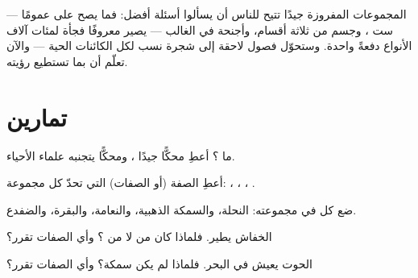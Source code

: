 \begin{remark}\label{rem:g3:sorting-living-things:science}
المجموعات المفروزة جيدًا تتيح للناس أن يسألوا أسئلة أفضل: فما يصح
على  عمومًا --- ست ، وجسم من ثلاثة أقسام، وأجنحة في
الغالب --- يصير معروفًا فجأة لمئات آلاف الأنواع دفعةً واحدة.
وستحوّل فصول لاحقة  إلى شجرة نسب لكل الكائنات الحية ---
والآن تعلّم أن  بما تستطيع رؤيته.
\end{remark}

\section{تمارين}

\begin{exercise}[$\star$]\label{exo:g3:sorting-living-things:1}
ما ؟ أعطِ محكًّا جيدًا  ، ومحكًّا يتجنبه علماء
الأحياء.
\end{exercise}

\begin{exercise}[$\star$]\label{exo:g3:sorting-living-things:2}
أعطِ الصفة (أو الصفات) التي تحدّ كل مجموعة: ، ،
، .
\end{exercise}

\begin{exercise}[$\star$]\label{exo:g3:sorting-living-things:3}
ضع كل  في مجموعته: النحلة، والسمكة الذهبية، والنعامة،
والبقرة، والضفدع.
\end{exercise}

\begin{exercise}[$\star$]\label{exo:g3:sorting-living-things:4}
الخفاش يطير. فلماذا كان من  لا من ؟ وأي الصفات
تقرر؟
\end{exercise}

\begin{exercise}[$\star$]\label{exo:g3:sorting-living-things:5}
الحوت يعيش في البحر. فلماذا لم يكن سمكة؟ وأي الصفات تقرر؟
\end{exercise}

